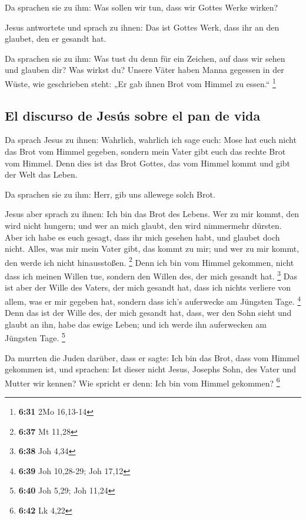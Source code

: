  Da sprachen sie zu ihm: Was sollen wir tun, dass wir
Gottes Werke wirken?

 Jesus antwortete und sprach zu ihnen: Das ist Gottes
Werk, dass ihr an den glaubet, den er gesandt hat.

 Da sprachen sie zu ihm: Was tust du denn für ein
Zeichen, auf dass wir sehen und glauben dir? Was wirkst du?
 Unsere Väter haben Manna gegessen in der Wüste, wie
geschrieben steht: „Er gab ihnen Brot vom Himmel zu essen.`` \footnote{\textbf{6:31}
  2Mo 16,13-14}

\hypertarget{el-discurso-de-jesuxfas-sobre-el-pan-de-vida}{%
\subsection{El discurso de Jesús sobre el pan de
vida}\label{el-discurso-de-jesuxfas-sobre-el-pan-de-vida}}

 Da sprach Jesus zu ihnen: Wahrlich, wahrlich ich sage
euch: Mose hat euch nicht das Brot vom Himmel gegeben, sondern mein
Vater gibt euch das rechte Brot vom Himmel.  Denn dies
ist das Brot Gottes, das vom Himmel kommt und gibt der Welt das Leben.

 Da sprachen sie zu ihm: Herr, gib uns allewege solch
Brot.

 Jesus aber sprach zu ihnen: Ich bin das Brot des Lebens.
Wer zu mir kommt, den wird nicht hungern; und wer an mich glaubt, den
wird nimmermehr dürsten.  Aber ich habe es euch gesagt,
dass ihr mich gesehen habt, und glaubet doch nicht. 
Alles, was mir mein Vater gibt, das kommt zu mir; und wer zu mir kommt,
den werde ich nicht hinausstoßen. \footnote{\textbf{6:37} Mt 11,28}
 Denn ich bin vom Himmel gekommen, nicht dass ich meinen
Willen tue, sondern den Willen des, der mich gesandt hat. \footnote{\textbf{6:38}
  Joh 4,34}  Das ist aber der Wille des Vaters, der mich
gesandt hat, dass ich nichts verliere von allem, was er mir gegeben hat,
sondern dass ich's auferwecke am Jüngsten Tage. \footnote{\textbf{6:39}
  Joh 10,28-29; Joh 17,12}  Denn das ist der Wille des,
der mich gesandt hat, dass, wer den Sohn sieht und glaubt an ihn, habe
das ewige Leben; und ich werde ihn auferwecken am Jüngsten Tage.
\footnote{\textbf{6:40} Joh 5,29; Joh 11,24}

 Da murrten die Juden darüber, dass er sagte: Ich bin das
Brot, dass vom Himmel gekommen ist,  und sprachen: Ist
dieser nicht Jesus, Josephs Sohn, des Vater und Mutter wir kennen? Wie
spricht er denn: Ich bin vom Himmel gekommen? \footnote{\textbf{6:42} Lk
  4,22}

